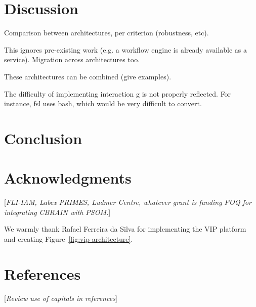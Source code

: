 \documentclass[preprint,3p,twocolumn]{elsarticle}
\newcommand{\todo}[1]{\color{blue}\xspace[\emph{#1}]\xspace\color{black}}
\begin{document}
\section{Discussion}

Comparison between architectures, per criterion (robustness, etc).

This ignores pre-existing work (e.g. a workflow engine is already available as a service). Migration across architectures too.

These architectures can be combined (give examples). 

The difficulty of implementing interaction g is not properly
reflected. For instance, fsl uses bash, which would be very difficult to convert.

\section{Conclusion}

\section{Acknowledgments}

\todo{FLI-IAM, Labex PRIMES, Ludmer Centre, whatever grant is funding
  POQ for integrating CBRAIN with PSOM.}

We warmly thank Rafael Ferreira da Silva for implementing the VIP
platform and creating Figure~\ref{fig:vip-architecture}.

\section*{References}

\todo{Review use of capitals in references}
 

\end{document}
